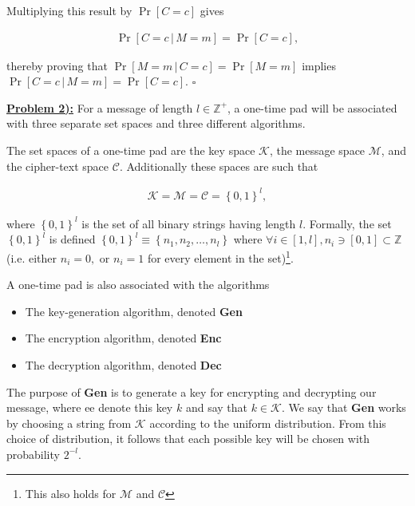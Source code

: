 \documentclass{article}[12]
\numberwithin{equation}{section}
\newcommand{\numbpr}[1]{\setcounter{section}{#1} \setcounter{equation}{0}}
\newcommand{\prob}[1]{\textbf{\underline{Problem #1):}}}
\newcommand{\Z}{\mathbb{Z}}
\begin{document}
\begin{flushleft}
Multiplying this result by $\Pr \left[ C = c \right]$ gives

\begin{align}
\Pr \left[ C = c \, \vert \, M = m \right] = \Pr \left[ C = c \right],
\end{align}

thereby proving that $\Pr \left[ M = m \, \vert \, C = c \right] = \Pr \left[ M = m \right]$ implies $\Pr \left[ C = c \, \vert \, M = m \right] = \Pr \left[ C = c \right]$. \newline
$\square$ \newline


\vspace{0.33 in}


\numbpr{2}
\prob{2}  For a message of length $l \in \Z^+$, a one-time pad will be associated with three separate set spaces and three different algorithms.  \newline

The set spaces of a one-time pad are the key space $\mathcal{K}$, the message space $\mathcal{M}$, and the cipher-text space $\mathcal{C}$.  Additionally these spaces are such that

\begin{align}
\mathcal{K} = \mathcal{M} = \mathcal{C} = \left\{ 0, 1 \right\}^l,
\end{align}

where $\left\{ 0, 1 \right\}^l$ is the set of all binary strings having length $l$. Formally, the set $\left\{ 0, 1 \right\}^l$ is defined $\left\{ 0, 1 \right\}^l \equiv \left\{ n_1, n_2, \dots, n_l \right\}$ where $\forall i \in \left[1, l\right], n_i \ni \left[ 0, 1 \right] \subset \Z$ (i.e. either $n_i = 0,$ or $n_i = 1$ for every element in the set)\footnote{This also holds for $\mathcal{M}$ and $\mathcal{C}$}. \newline

A one-time pad is also associated with the algorithms

\begin{itemize}
	\item The key-generation algorithm, denoted {\selectfont \textbf{Gen}}
	\item The encryption algorithm, denoted {\selectfont \textbf{Enc}}
	\item The decryption algorithm, denoted {\selectfont \textbf{Dec}}
\end{itemize}

The purpose of {\selectfont \textbf{Gen}} is to generate a key for encrypting and decrypting our message, where ee denote this key $k$ and say that $k \in \mathcal{K}$. We say that {\selectfont \textbf{Gen}} works by choosing a string from $\mathcal{K}$ according to the uniform distribution.  From this choice of distribution, it follows that each possible key will be chosen with probability $2^{-l}$. \newline


\end{flushleft}
\end{document}
